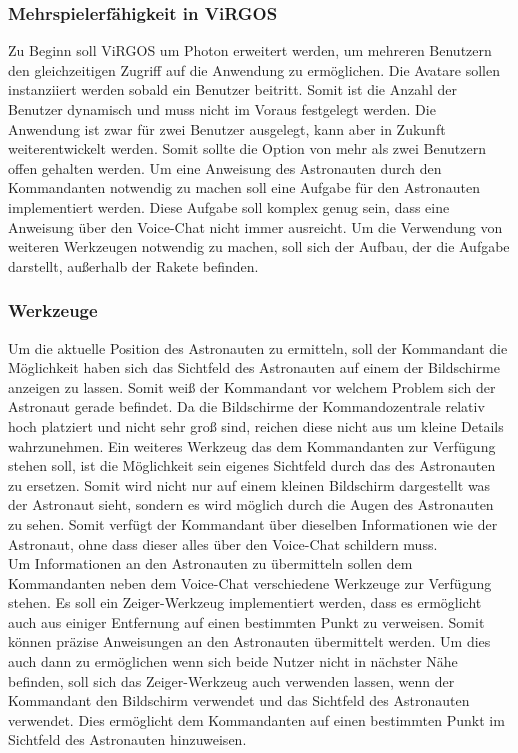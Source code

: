 \subsubsection{Mehrspielerfähigkeit in ViRGOS}
Zu Beginn soll ViRGOS um Photon erweitert werden, um mehreren Benutzern den gleichzeitigen Zugriff auf die Anwendung zu ermöglichen. Die Avatare sollen instanziiert werden sobald ein Benutzer beitritt. Somit ist die Anzahl der Benutzer dynamisch und muss nicht im Voraus festgelegt werden. Die Anwendung ist zwar für zwei Benutzer ausgelegt, kann aber in Zukunft weiterentwickelt werden. Somit sollte die Option von mehr als zwei Benutzern offen gehalten werden. Um eine Anweisung des Astronauten durch den Kommandanten notwendig zu machen soll eine Aufgabe für den Astronauten implementiert werden. Diese Aufgabe soll komplex genug sein, dass eine Anweisung über den Voice-Chat nicht immer ausreicht. Um die Verwendung von weiteren Werkzeugen notwendig zu machen, soll sich der Aufbau, der die Aufgabe darstellt, außerhalb der Rakete befinden. 

\subsubsection{Werkzeuge}
Um die aktuelle Position des Astronauten zu ermitteln, soll der Kommandant die Möglichkeit haben sich das Sichtfeld des Astronauten auf einem der Bildschirme anzeigen zu lassen. Somit weiß der Kommandant vor welchem Problem sich der Astronaut gerade befindet. Da die Bildschirme der Kommandozentrale relativ hoch platziert und nicht sehr groß sind, reichen diese nicht aus um kleine Details wahrzunehmen. Ein weiteres Werkzeug das dem Kommandanten zur Verfügung stehen soll, ist die Möglichkeit sein eigenes Sichtfeld durch das des Astronauten zu ersetzen. Somit wird nicht nur auf einem kleinen Bildschirm dargestellt was der Astronaut sieht, sondern es wird möglich durch die Augen des Astronauten zu sehen. Somit verfügt der Kommandant über dieselben Informationen wie der Astronaut, ohne dass dieser alles über den Voice-Chat schildern muss. \\

\noindent Um Informationen an den Astronauten zu übermitteln sollen dem Kommandanten neben dem Voice-Chat verschiedene Werkzeuge zur Verfügung stehen. Es soll ein Zeiger-Werkzeug implementiert werden, dass es ermöglicht auch aus einiger Entfernung auf einen bestimmten Punkt zu verweisen. Somit können präzise Anweisungen an den Astronauten übermittelt werden. Um dies auch dann zu ermöglichen wenn sich beide Nutzer nicht in nächster Nähe befinden, soll sich das Zeiger-Werkzeug auch verwenden lassen, wenn der Kommandant den Bildschirm verwendet und das Sichtfeld des Astronauten verwendet. Dies ermöglicht dem Kommandanten auf einen bestimmten Punkt im Sichtfeld des Astronauten hinzuweisen. \newline

